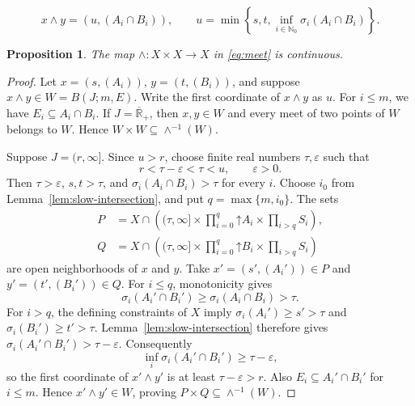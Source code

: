 \documentclass[10pt,a4paper]{amsart}
\newtheorem{proposition}{Proposition}
\newcommand{\NN}{\mathbb N}
\newcommand{\RR}{\overline{\mathbb R}_{+}}
\newcommand{\up}{\mathord\uparrow}
\begin{document}
\begin{equation}\label{eq:meet}
x\wedge y=(u,(A_i\cap B_i)),\qquad
u=\min\left\{s,t,\inf_{i\in\NN_0}\sigma_i(A_i\cap B_i)\right\}.
\end{equation}

\begin{proposition}\label{prop:continuous-meet}
The map $\wedge:X\times X\longrightarrow X$ in \eqref{eq:meet}
is continuous.
\end{proposition}

\begin{proof}
Let $x=(s,(A_i))$, $y=(t,(B_i))$, and suppose
$x\wedge y\in W=B(J;m,E)$. Write the first coordinate of
$x\wedge y$ as $u$. For $i\leq m$, we have $E_i\subseteq A_i\cap B_i$.
If $J=\RR$, then $x,y\in W$ and every meet of two points of $W$
belongs to $W$. Hence $W\times W\subseteq\wedge^{-1}(W)$.

Suppose $J=(r,\infty]$. Since $u>r$, choose finite real numbers
$\tau,\varepsilon$ such that
\begin{equation}\label{eq:margin}
r<\tau-\varepsilon<\tau<u,\qquad\varepsilon>0.
\end{equation}
Then $\tau>\varepsilon$, $s,t>\tau$, and
$\sigma_i(A_i\cap B_i)>\tau$ for every $i$.
Choose $i_0$ from Lemma~\ref{lem:slow-intersection}, and put
$q=\max\{m,i_0\}$. The sets
\begin{align*}
P&=X\cap\left((\tau,\infty]\times\prod_{i=0}^{q}\up A_i
                                      \times\prod_{i>q}S_i\right),\\
Q&=X\cap\left((\tau,\infty]\times\prod_{i=0}^{q}\up B_i
                                      \times\prod_{i>q}S_i\right)
\end{align*}
are open neighborhoods of $x$ and $y$.
Take $x'=(s',(A_i'))\in P$ and $y'=(t',(B_i'))\in Q$.
For $i\leq q$, monotonicity gives
\[
\sigma_i(A_i'\cap B_i')\geq\sigma_i(A_i\cap B_i)>\tau.
\]
For $i>q$, the defining constraints of $X$ imply
$\sigma_i(A_i')\geq s'>\tau$ and
$\sigma_i(B_i')\geq t'>\tau$. Lemma~\ref{lem:slow-intersection}
therefore gives $\sigma_i(A_i'\cap B_i')>\tau-\varepsilon$.
Consequently
\[
\inf_i\sigma_i(A_i'\cap B_i')\geq\tau-\varepsilon,
\]
so the first coordinate of $x'\wedge y'$ is at least
$\tau-\varepsilon>r$. Also $E_i\subseteq A_i'\cap B_i'$ for
$i\leq m$. Hence $x'\wedge y'\in W$, proving
$P\times Q\subseteq\wedge^{-1}(W)$.
\end{proof}
\end{document}
